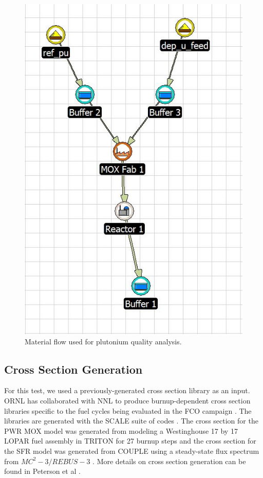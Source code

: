 \documentclass{article}
\begin{document}
\begin{figure}[htbp!]
    \begin{center}
        \includegraphics[scale=0.5]{./flow.jpg}
    \end{center}
    \caption{Material flow used for plutonium quality analysis.}
    \label{fig:flow}
\end{figure}

\subsection{Cross Section Generation}
For this test, we used a previously-generated cross section library as an input.
\gls{ORNL} has collaborated with \gls{NNL} to produce burnup-dependent cross section libraries specific to the fuel
cycles being evaluated in the FCO campaign \cite{wigeland_nuclear_2014}. The libraries are generated with the
SCALE suite of codes \cite{noauthor_scale_nodate}. The cross section for the \gls{PWR} \gls{MOX} model was generated from modeling
a Westinghouse 17 by 17 LOPAR fuel assembly in TRITON for 27 burnup steps and the cross section for the \gls{SFR}
model was generated from COUPLE using a steady-state flux spectrum from $MC^2-3 / REBUS-3$ \cite{lee_mc2-3:_2013}.
More details on cross section generation can be found in Peterson et al \cite{peterson_generating_2016}.
\end{document}
